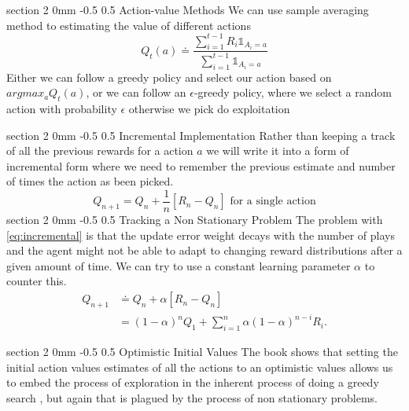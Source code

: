 \documentclass[twocolumn,11pt]{article}
\makeatletter
\renewcommand{\section}{\@startsection
{section}%
{2}%
{0mm}%
{-0.5\baselineskip}%
{0.5\baselineskip}%
{\bfseries\color{blue}}} %
\makeatother
\begin{document}
\section{Action-value Methods}
We can use sample averaging method to estimating the value of different actions
\useshortskip\begin{equation}
    Q_t(a) \doteq  \dfrac{\sum_{i=1}^{t-1}R_i\mathbb{1}_{A_i = a}}{\sum_{i=1}^{t-1}\mathbb{1}_{A_i = a}}
\end{equation}
Either we can follow a greedy policy and select our action based on $argmax_a Q_t(a)$, or we can follow an $\epsilon$-greedy policy, where we select a random action with probability $\epsilon$ otherwise we pick do exploitation

\section{Incremental Implementation}
Rather than keeping a track of all the previous rewards for a action $a$ we will write it into a form of incremental form where we need to remember the previous estimate and number of times the action as been picked.\useshortskip
\begin{equation}\label{eq:incremental}
    Q_{n+1} = Q_n + \dfrac{1}{n}[R_n - Q_n] \text{ for a single action}
\end{equation}
\section{Tracking a Non Stationary Problem}
The problem with \ref{eq:incremental} is that the update error weight decays with the number of plays and the agent might not be able to adapt to changing reward distributions after a given amount of time. We can try to use a constant learning parameter $\alpha$ to counter this.
\begin{equation}
    \begin{split}
        Q_{n+1} &\doteq Q_n + \alpha[R_n - Q_n]\\
        &= (1 - \alpha)^n Q_1 + \sum_{i=1}^{n}\alpha(1 -\alpha)^{n-i}R_i.
    \end{split}
\end{equation}


\section{Optimistic Initial Values}
The book \cite{sutton2018reinforcement} shows that setting the initial action values estimates of all the actions to an optimistic values allows us to embed the process of exploration in the inherent process of doing a greedy search , but again that is plagued by the process of non stationary problems.
\end{document}
